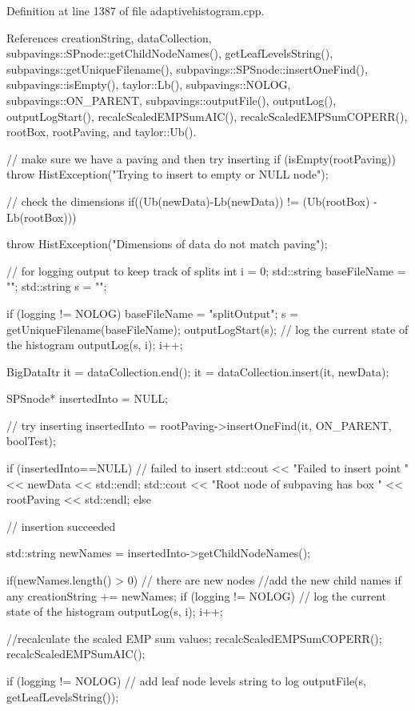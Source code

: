 \-Definition at line 1387 of file adaptivehistogram.\-cpp.



\-References creation\-String, data\-Collection, subpavings\-::\-S\-Pnode\-::get\-Child\-Node\-Names(), get\-Leaf\-Levels\-String(), subpavings\-::get\-Unique\-Filename(), subpavings\-::\-S\-P\-Snode\-::insert\-One\-Find(), subpavings\-::is\-Empty(), taylor\-::\-Lb(), subpavings\-::\-N\-O\-L\-O\-G, subpavings\-::\-O\-N\-\_\-\-P\-A\-R\-E\-N\-T, subpavings\-::output\-File(), output\-Log(), output\-Log\-Start(), recalc\-Scaled\-E\-M\-P\-Sum\-A\-I\-C(), recalc\-Scaled\-E\-M\-P\-Sum\-C\-O\-P\-E\-R\-R(), root\-Box, root\-Paving, and taylor\-::\-Ub().


\begin{DoxyCode}
{
    // make sure we have a paving and then try inserting
    if (isEmpty(rootPaving)) {
        throw HistException("Trying to insert to empty or NULL node");
    }

    // check the dimensions
    if((Ub(newData)-Lb(newData)) != (Ub(rootBox) - Lb(rootBox))) {
        throw HistException("Dimensions of data do not match paving");

    }

    // for logging output to keep track of splits
    int i = 0;
    std::string baseFileName = "";
    std::string s = "";

    if (logging != NOLOG) {
        baseFileName = "splitOutput";
        s = getUniqueFilename(baseFileName);
        outputLogStart(s);
        // log the current state of the histogram
        outputLog(s, i);
        i++;
    }


    BigDataItr it = dataCollection.end();
    it = dataCollection.insert(it, newData);

    SPSnode* insertedInto = NULL;

    // try inserting
    insertedInto = rootPaving->insertOneFind(it, ON_PARENT,
                                            boolTest);

    if (insertedInto==NULL) { // failed to insert
        std::cout << "Failed to insert point " << newData << std::endl;
        std::cout << "Root node of subpaving has box " << rootPaving
            << std::endl;
    }
    else { // insertion succeeded

        std::string newNames = insertedInto->getChildNodeNames();

        if(newNames.length() > 0) { // there are new nodes
            //add the new child names if any
            creationString += newNames;
            if (logging != NOLOG) {
                // log the current state of the histogram
                outputLog(s, i);
                i++;
            }
        }

        //recalculate the scaled EMP sum values;
        recalcScaledEMPSumCOPERR();
        recalcScaledEMPSumAIC();
    }
    if (logging != NOLOG) {
        // add leaf node levels string to log
        outputFile(s, getLeafLevelsString());
    }
}
\end{DoxyCode}
